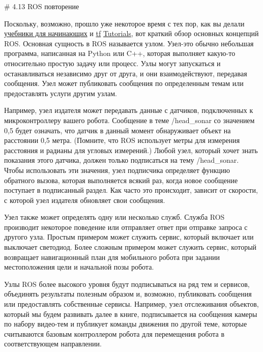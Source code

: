 # 4.13 ROS повторение


Поскольку, возможно, прошло уже некоторое время с тех пор, как вы делали \href{http://wiki.ros.org/ROS/Tutorials}{учебники для начинающих} и \href{http://wiki.ros.org/tf/Tutorials}{tf} \href{4.8-rabota-s-official-ros-tutorials.md}{Tutorials}, вот краткий обзор основных концепций ROS. Основная сущность в ROS называется узлом. Узел-это обычно небольшая программа, написанная на Python или C++, которая выполняет какую-то относительно простую задачу или процесс. Узлы могут запускаться и останавливаться независимо друг от друга, и они взаимодействуют, передавая сообщения. Узел может публиковать сообщения по определенным темам или предоставлять услуги другим узлам. 

Например, узел издателя может передавать данные с датчиков, подключенных к микроконтроллеру вашего робота. Сообщение в теме /head\_sonar со значением 0,5 будет означать, что датчик в данный момент обнаруживает объект на расстоянии 0,5 метра. (Помните, что ROS использует метры для измерения расстояния и радианы для угловых измерений.) Любой узел, который хочет знать показания этого датчика, должен только подписаться на тему /head\_sonar. Чтобы использовать эти значения, узел подписчика определяет функцию обратного вызова, которая выполняется всякий раз, когда новое сообщение поступает в подписанный раздел. Как часто это происходит, зависит от скорости, с которой узел издателя обновляет свои сообщения. 

Узел также может определять одну или несколько служб. Служба ROS производит некоторое поведение или отправляет ответ при отправке запроса с другого узла. Простым примером может служить сервис, который включает или выключает светодиод. Более сложным примером может служить сервис, который возвращает навигационный план для мобильного робота при задании местоположения цели и начальной позы робота. 

Узлы ROS более высокого уровня будут подписываться на ряд тем и сервисов, объединять результаты полезным образом и, возможно, публиковать сообщения или предоставлять собственные сервисы. Например, узел отслеживания объектов, который мы будем развивать далее в книге, подписывается на сообщения камеры по набору видео-тем и публикует команды движения по другой теме, которые считываются базовым контроллером робота для перемещения робота в соответствующем направлении.

